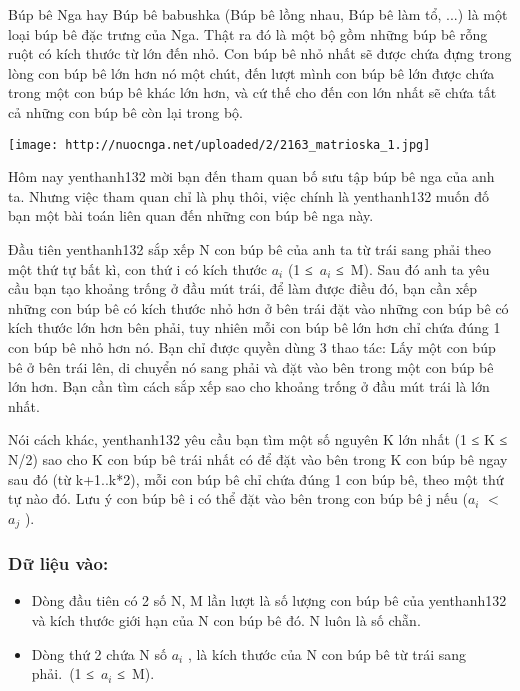 



Búp bê Nga hay Búp bê babushka (Búp bê lồng nhau, Búp bê làm tổ, ...) là một loại búp bê đặc trưng của Nga. Thật ra đó là một bộ gồm những búp bê rỗng ruột có kích thước từ lớn đến nhỏ. Con búp bê nhỏ nhất sẽ được chứa đựng trong lòng con búp bê lớn hơn nó một chút, đến lượt mình con búp bê lớn được chứa trong một con búp bê khác lớn hơn, và cứ thế cho đến con lớn nhất sẽ chứa tất cả những con búp bê còn lại trong bộ.


\texttt{[image: http://nuocnga.net/uploaded/2/2163\_matrioska\_1.jpg]}

   Hôm nay   yenthanh132   mời bạn đến tham quan bố sưu tập búp bê nga của anh ta. Nhưng việc tham quan chỉ là phụ thôi, việc chính là   yenthanh132   muốn đố bạn một bài toán liên quan đến những con búp bê nga này.  

   Đầu tiên   yenthanh132   sắp xếp N con búp bê của anh ta từ trái sang phải theo một thứ tự bất kì, con thứ i có kích thước $a_{i}$   (1 ≤ $a_{i}$   ≤ M). Sau đó anh ta yêu cầu bạn tạo khoảng trống ở đầu mút trái, để làm được điều đó, bạn cần xếp những con búp bê có kích thước nhỏ hơn ở bên trái đặt vào những con búp bê có kích thước lớn hơn bên phải, tuy nhiên mỗi con búp bê lớn hơn chỉ chứa đúng 1 con búp bê nhỏ hơn nó. Bạn chỉ được quyền dùng 3 thao tác: Lấy một con búp bê ở bên trái lên, di chuyển nó sang phải và       đặt vào bên trong      một con búp bê lớn hơn. Bạn cần tìm cách sắp xếp sao cho khoảng trống ở đầu mút trái là lớn nhất.  

   Nói cách khác,   yenthanh132   yêu cầu bạn tìm một số nguyên K lớn nhất (1 ≤ K ≤ N/2) sao cho K con búp bê trái nhất có để đặt vào bên trong K con búp bê ngay sau đó (từ k+1..k*2), mỗi con búp bê chỉ chứa đúng 1 con búp bê, theo một thứ tự nào đó. Lưu ý con búp bê i có thể đặt vào bên trong con búp bê j nếu ($a_{i}$   $<$ $a_{j}$   ).  

\subsubsection{   Dữ liệu vào:  }
\begin{itemize}
	\item     Dòng đầu tiên có 2 số N, M lần lượt là số lượng con búp bê của    yenthanh132    và kích thước giới hạn của N con búp bê đó. N luôn là số chẵn.   
	\item     Dòng thứ 2 chứa N số $a_{i}$    , là kích thước của N con búp bê từ trái sang phải. (1 ≤ $a_{i}$    ≤ M).   
\end{itemize}

